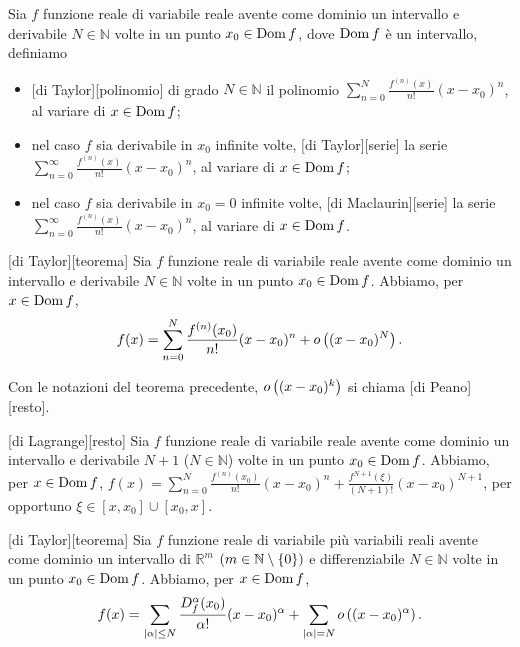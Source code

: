 \begin{Definition}
	Sia $f$ funzione reale di variabile reale avente come dominio un intervallo e derivabile $N \in \mathbb{N}$ volte in un punto $x_0 \in \operatorname{Dom}{f}$, dove $\operatorname{Dom}{f}$ \`e un intervallo, definiamo
	\begin{itemize}
		\item {}[di Taylor][polinomio] di grado $N \in \mathbb{N}$ il polinomio $\sum_{n = 0}^N \frac{f^{(n)}(x)}{n!} (x - x_0)^n$, al variare di $x \in \operatorname{Dom}{f}$;
		\item nel caso $f$ sia derivabile in $x_0$ infinite volte, [di Taylor][serie] la serie $\sum_{n = 0}^\infty \frac{f^{(n)}(x)}{n!} (x - x_0)^n$, al variare di $x \in \operatorname{Dom}{f}$;
		\item nel caso $f$ sia derivabile in $x_0 = 0$ infinite volte, [di Maclaurin][serie] la serie $\sum_{n = 0}^\infty \frac{f^{(n)}(x)}{n!} (x - x_0)^n$, al variare di $x \in \operatorname{Dom}{f}$.
	\end{itemize}
\end{Definition}
\begin{Theorem}
	[di Taylor][teorema]
	Sia $f$ funzione reale di variabile reale avente come dominio un intervallo e derivabile $N \in \mathbb{N}$ volte in un punto $x_0 \in \operatorname{Dom}{f}$. Abbiamo, per $x \in \operatorname{Dom}{f}$,
\[
	f(x) = \sum_{n = 0}^N \frac{f^{(n)}(x_0)}{n!} (x - x_0)^n + o \left ( (x - x_0)^N \right ).
\]
\end{Theorem}
\begin{Definition}
	Con le notazioni del teorema precedente, $o \left ( (x - x_0)^k \right )$ si chiama [di Peano][resto].
\end{Definition}
\begin{Theorem}
	[di Lagrange][resto] 
	Sia $f$ funzione reale di variabile reale avente come dominio un intervallo e derivabile $N + 1$ ($N \in \mathbb{N}$) volte in un punto $x_0 \in \operatorname{Dom}{f}$. Abbiamo, per $x \in \operatorname{Dom}{f}$, $f(x) = \sum_{n = 0}^N \frac{f^{(n)}(x_0)}{n!} (x - x_0)^n + \frac{f^{N + 1}(\xi)}{(N + 1)!}(x - x_0)^{N + 1}$, per opportuno $\xi \in [x,x_0] \cup [x_0,x]$. 
\end{Theorem}
\begin{Theorem}
	[di Taylor][teorema]
	Sia $f$ funzione reale di variabile pi\`u variabili reali avente come dominio un intervallo di $\mathbb{R}^m$ $(m \in \mathbb{N} \setminus \lbrace 0 \rbrace)$ e differenziabile $N \in \mathbb{N}$ volte in un punto $x_0 \in \operatorname{Dom}{f}$. Abbiamo, per $x \in \operatorname{Dom}{f}$,
\[
	f(x) = \sum_{\left \lvert \alpha \right \rvert \leq N} \frac{D^{\alpha}_{f}(x_0)}{\alpha!} (x - x_0)^\alpha + \sum_{\left \lvert \alpha \right \rvert = N}o \left ( (x - x_0)^\alpha \right ).
\]
\end{Theorem}
